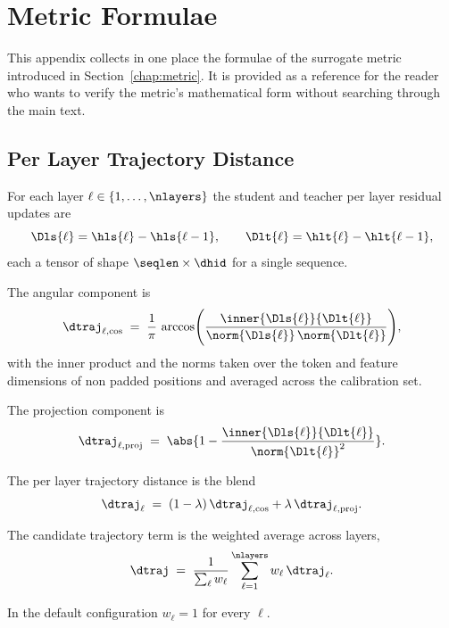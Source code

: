 \section{Metric Formulae}
\label{app:formulas}

This appendix collects in one place the formulae of the surrogate metric introduced in Section~\ref{chap:metric}. It is provided as a reference for the reader who wants to verify the metric's mathematical form without searching through the main text.

\subsection{Per Layer Trajectory Distance}

For each layer $\ell \in \{1, \ldots, \nlayers\}$ the student and teacher per layer residual updates are
\begin{equation}
\Dls{\ell} = \hls{\ell} - \hls{\ell - 1}, \qquad \Dlt{\ell} = \hlt{\ell} - \hlt{\ell - 1},
\end{equation}
each a tensor of shape $\seqlen \times \dhid$ for a single sequence.

The angular component is
\begin{equation}
\dtraj_{\ell, \cos} \;=\; \frac{1}{\pi} \, \arccos\!\Bigg( \frac{\inner{\Dls{\ell}}{\Dlt{\ell}}}{\norm{\Dls{\ell}} \, \norm{\Dlt{\ell}}} \Bigg),
\end{equation}
with the inner product and the norms taken over the token and feature dimensions of non padded positions and averaged across the calibration set.

The projection component is
\begin{equation}
\dtraj_{\ell, \mathrm{proj}} \;=\; \abs{1 - \frac{\inner{\Dls{\ell}}{\Dlt{\ell}}}{\norm{\Dlt{\ell}}^2}}.
\end{equation}

The per layer trajectory distance is the blend
\begin{equation}
\dtraj_\ell \;=\; (1 - \lambda) \, \dtraj_{\ell, \cos} + \lambda \, \dtraj_{\ell, \mathrm{proj}}.
\end{equation}

The candidate trajectory term is the weighted average across layers,
\begin{equation}
\dtraj \;=\; \frac{1}{\sum_\ell w_\ell} \sum_{\ell = 1}^{\nlayers} w_\ell \, \dtraj_\ell.
\end{equation}

In the default configuration $w_\ell = 1$ for every $\ell$.

